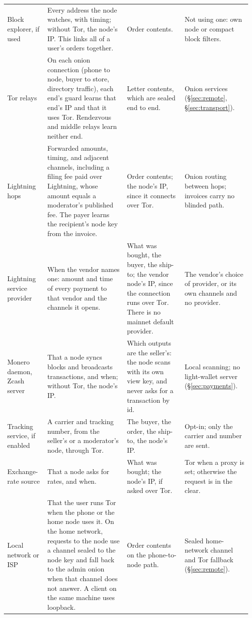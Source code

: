 {\begin{longtable}{@{}p{}p{}p{}p{}@{}}
Block explorer, if used & Every address the node watches, with timing; without Tor, the node's IP. This links all of a user's orders together. & Order contents. & Not using one: own node or compact block filters. \\
Tor relays & On each onion connection (phone to node, buyer to store, directory traffic), each end's guard learns that end's IP and that it uses Tor. Rendezvous and middle relays learn neither end. & Letter contents, which are sealed end to end. & Onion services (\S\ref{sec:remote}, \S\ref{sec:transport}). \\
Lightning hops & Forwarded amounts, timing, and adjacent channels, including a filing fee paid over Lightning, whose amount equals a moderator's published fee. The payer learns the recipient's node key from the invoice. & Order contents; the node's IP, since it connects over Tor. & Onion routing between hops; invoices carry no blinded path. \\
Lightning service provider & When the vendor names one: amount and time of every payment to that vendor and the channels it opens. & What was bought, the buyer, the ship-to; the vendor node's IP, since the connection runs over Tor. There is no mainnet default provider. & The vendor's choice of provider, or its own channels and no provider. \\
Monero daemon, Zcash server & That a node syncs blocks and broadcasts transactions, and when; without Tor, the node's IP. & Which outputs are the seller's: the node scans with its own view key, and never asks for a transaction by id. & Local scanning; no light-wallet server (\S\ref{sec:payments}). \\
Tracking service, if enabled & A carrier and tracking number, from the seller's or a moderator's node, through Tor. & The buyer, the order, the ship-to, the node's IP. & Opt-in; only the carrier and number are sent. \\
Exchange-rate source & That a node asks for rates, and when. & What was bought; the node's IP, if asked over Tor. & Tor when a proxy is set; otherwise the request is in the clear. \\
Local network or ISP & That the user runs Tor when the phone or the home node uses it. On the home network, requests to the node use a channel sealed to the node key and fall back to the admin onion when that channel does not answer. A client on the same machine uses loopback. & Order contents on the phone-to-node path. & Sealed home-network channel and Tor fallback (\S\ref{sec:remote}). \\

\end{longtable}}
